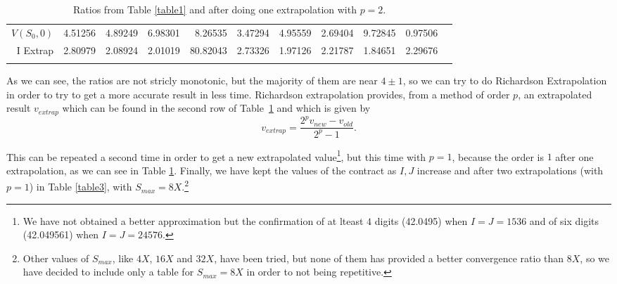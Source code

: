 \begin{table}[h]\scriptsize
	\setlength{\tabcolsep}{8pt}
	\renewcommand{\arraystretch}{1.3}
	\begin{tabular}{r|rrrrrrrrrr}
		\hline\addlinespace[0.1cm]
		$V(S_0,0)$ & 4.51256 & 4.89249 & 6.98301 &  8.26535 & 3.47294 & 4.95559 & 2.69404 & 9.72845 & 0.97506 & \\
		I Extrap & 2.80979 & 2.08924 & 2.01019 & 80.82043 & 2.73326 & 1.97126 & 2.21787 & 1.84651 & 2.29676 &          \\\addlinespace[0.1cm]
		\hline
	\end{tabular}
	\vspace{0.2cm}
	\captionsetup{width=.55\linewidth}
	\caption{Ratios from Table \ref{table1} and after doing one extrapolation with $p=2$.}\label{table2}
\end{table}
\vspace{-1cm}
As we can see, the ratios are not stricly monotonic, but the majority of them are near $4\pm1$, so we can try to do Richardson Extrapolation in order to try to get a more accurate result in less time. Richardson extrapolation provides, from a method of order $p$, an extrapolated result $v_{extrap}$ which can be found in the second row of Table~\ref{table2} and which is given by
\begin{equation}
	v_{extrap} = \frac{2^p v_{new} - v_{old} }{2^p - 1}.
\end{equation}

This can be repeated a second time in order to get a new extrapolated value\footnote{We have not obtained a better approximation but the confirmation of at lteast $4$ digits (42.0495) when $I=J=1536$ and of six digits (42.049561) when $I=J=24576$.}, but this time with $p=1$, because the order is $1$ after one extrapolation, as we can see in Table \ref{table2}. Finally, we have kept the values of the contract as $I, J$ increase and after two extrapolations (with $p=1$) in Table \ref{table3}, with $S_{max} = 8X$.\footnote{Other values of $S_{max}$, like $4X$, $16X$ and $32X$, have been tried, but none of them has provided a better convergence ratio than $8X$, so we have decided to include only a table for $S_{max}=8X$ in order to not being repetitive.}

